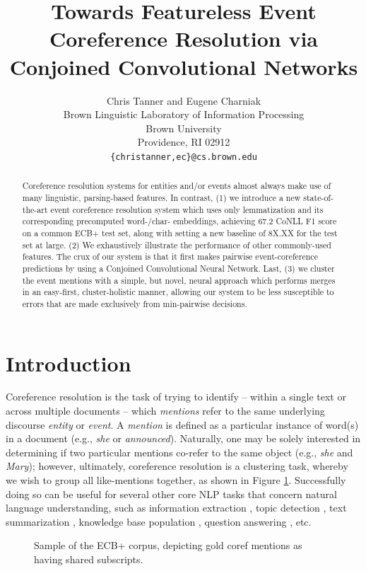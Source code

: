 \documentclass[11pt,a4paper]{article}
\title{Towards Featureless Event Coreference Resolution via Conjoined Convolutional Networks}
\author{Chris Tanner \textnormal{and} Eugene Charniak\\
Brown Linguistic Laboratory of Information Processing \\
  Brown University \\
  Providence, RI  02912 \\
  {\tt \{christanner,ec\}@cs.brown.edu} \\}
\date{}
\begin{document}
\maketitle
\begin{abstract}
Coreference resolution systems for entities and/or events almost always make use of many linguistic, parsing-based features.  In contrast, (1) we introduce a new state-of-the-art event coreference resolution system which uses only lemmatization and its corresponding precomputed word-/char- embeddings, achieving 67.2 CoNLL F1 score on a common ECB+ test set, along with setting a new baseline of 8X.XX for the test set at large. (2) We exhaustively illustrate the performance of other commonly-used features.  The crux of our system is that it first makes pairwise event-coreference predictions by using a Conjoined Convolutional Neural Network.  Last, (3) we cluster the event mentions with a simple, but novel, neural approach which performs merges in an easy-first, cluster-holistic manner, allowing our system to be less susceptible to errors that are made exclusively from min-pairwise decisions.
\end{abstract}

\section{Introduction}
Coreference resolution is the task of trying to identify -- within a single text or across multiple documents -- which \textit{mentions} refer to the same underlying discourse \textit{entity} or \textit{event}.  A \textit{mention} is defined as a particular instance of word(s) in a document (e.g., \textit{she} or \textit{announced}).  Naturally, one may be solely interested in determining if two particular mentions co-refer to the same object (e.g., \textit{she} and \textit{Mary}); however, ultimately, coreference resolution is a clustering task, whereby we wish to group all like-mentions together, as shown in Figure \ref{fig:corpus}.  Successfully doing so can be useful for several other core NLP tasks that concern natural language understanding, such as information extraction \cite{Humphreys:1997}, topic detection \cite{Allan:1998}, text summarization \cite{Daniel:2003}, knowledge base population \cite{Cross_Document_Coreference_Resolution_A_Key_Technology_for_Learning_by_Reading}, question answering \cite{Narayanan:2004:QAB:1220355.1220455}, etc.

\begin{figure}
\caption{Sample of the ECB+ corpus, depicting gold coref mentions as having shared subscripts.}
\label{fig:corpus}
\end{figure}
\end{document}
